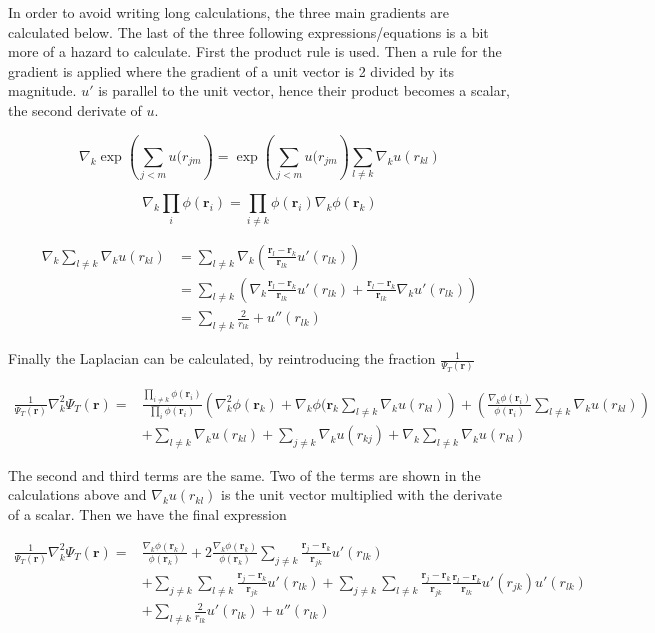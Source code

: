 \documentclass[
]{article}
\begin{document}
In order to avoid writing long calculations, the three main gradients
are calculated below. The last of the three following
expressions/equations is a bit more of a hazard to calculate. First the
product rule is used. Then a rule for the gradient is applied where the
gradient of a unit vector is 2 divided by its magnitude. \(u'\) is
parallel to the unit vector, hence their product becomes a scalar, the
second derivate of \(u\).

\[
\nabla_k
\exp{\left(\sum_{j <m}{u(r_{jm}}\right)} = \exp{\left(\sum_{j <m}{u(r_{jm}}\right)} \sum_{l \ne k}{\nabla_k u(r_{kl})}
\]

\[
\nabla_k \prod_i \phi(\mathbf{r}_i) = \prod _{i \ne k} \phi(\mathbf{r}_i) \nabla_k \phi(\mathbf {r}_k)
\]

\begin{align*}
\nabla_k \sum_{l \ne k}{\nabla_k u(r_{kl})} &= \sum_{l \ne k}{\nabla_k \left(\frac{\mathbf{r}_l - \mathbf {r}_k}{\mathbf{r} _{lk}} u'(r _{lk})\right)} \\ &= \sum _{l\ne k}\left(\nabla_k \frac{\mathbf{r}_l - \mathbf {r}_k}{\mathbf{r} _{lk}} u'(r _{lk}) + \frac{\mathbf{r}_l - \mathbf {r}_k}{\mathbf{r} _{lk}} \nabla_k u'(r _{lk}) \right) \\ &= \sum _{l\ne k} \frac{2}{r _{lk}} + u''(r _{lk})
\end{align*}

Finally the Laplacian can be calculated, by reintroducing the fraction
\(\frac{1}{\Psi_T(\mathbf{r})}\)

\begin{align*}
\frac{1}{\Psi_T(\mathbf{r})} \nabla_k^2 \Psi_T(\mathbf{r}) = &\frac{\prod_{i \ne k} \phi(\mathbf{r}_i)}{\prod _{i} \phi(\mathbf{r}_i)} \left(\nabla^2_k \phi(\mathbf{r}_k) + \nabla_k \phi(\mathbf{r}_k \sum _{l\ne k}\nabla_k u(r _{kl})\right)  + \left( \frac{\nabla_k \phi(\mathbf{r}_i)}{\phi(\mathbf{r}_i)} \sum _{l \ne k} \nabla_k u(r _{kl})\right) \\ &+ \sum _{l \ne k} \nabla_k u(r _{kl})  + \sum _{j \ne k} \nabla_k u(r _{kj}) + \nabla_k  \sum _{l \ne k} \nabla_k u(r _{kl})
\end{align*}

The second and third terms are the same. Two of the terms are shown in
the calculations above and \(\nabla_k u(r_{kl})\) is the unit vector
multiplied with the derivate of a scalar. Then we have the final
expression

\begin{align*}
\frac{1}{\Psi_T(\mathbf{r})} \nabla_k^2 \Psi_T(\mathbf{r}) = &\frac{\nabla_k \phi(\mathbf{r}_k)}{\phi(\mathbf{r}_k)} + 2 \frac{\nabla_k \phi(\mathbf{r}_k)}{\phi(\mathbf{r}_k)}\sum _{j\ne k}
\frac{\mathbf{r}_j - \mathbf {r}_k}{\mathbf{r} _{jk}}u'(r _{lk}) \\ &+ \sum _{j\ne k}\sum _{l\ne k}
\frac{\mathbf{r}_j - \mathbf {r}_k}{\mathbf{r} _{jk}} u'(r _{lk}) + \sum _{j\ne k}\sum _{l\ne k}
\frac{\mathbf{r}_j - \mathbf {r}_k}{\mathbf{r} _{jk}} \frac{\mathbf{r}_l - \mathbf {r}_k}{\mathbf{r} _{lk}}  u'(r _{jk})  u'(r _{lk}) \\ &+ \sum _{l\ne k} \frac{2}{r _{lk}} u'(r _{lk}) +  u''(r _{lk})
\end{align*}
\end{document}
